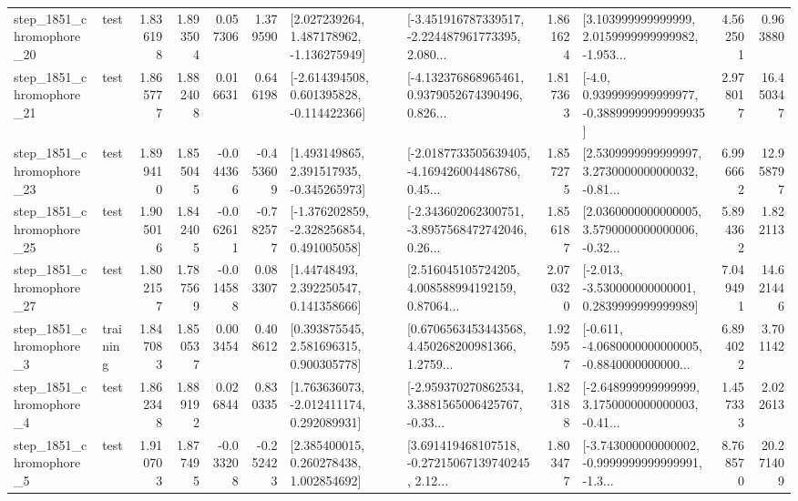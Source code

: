 \begin{tabular}{llrrrrllrlrr}
 step\_1851\_chromophore\_20 &      test &      1.836198 &    1.893504 &      0.057306 &  1.379590 &    [2.027239264, 1.487178962, -1.136275949] &  [-3.451916787339517, -2.224487961773395, 2.080... &       1.861624 &  [3.103999999999999, 2.0159999999999982, -1.953... &            4.562501 &          0.963880 \\
 step\_1851\_chromophore\_21 &      test &      1.865777 &    1.882408 &      0.016631 &  0.646198 &   [-2.614394508, 0.601395828, -0.114422366] &  [-4.132376868965461, 0.9379052674390496, 0.826... &       1.817363 &   [-4.0, 0.9399999999999977, -0.38899999999999935] &            2.978017 &         16.450347 \\
 step\_1851\_chromophore\_23 &      test &      1.899410 &    1.855045 &     -0.044366 & -0.453609 &    [1.493149865, 2.391517935, -0.345265973] &  [-2.0187733505639405, -4.169426004486786, 0.45... &       1.857275 &  [2.5309999999999997, 3.2730000000000032, -0.81... &            6.996662 &         12.958797 \\
 step\_1851\_chromophore\_25 &      test &      1.905016 &    1.842405 &     -0.062611 & -0.782577 &   [-1.376202859, -2.328256854, 0.491005058] &  [-2.343602062300751, -3.8957568472742046, 0.26... &       1.856187 &  [2.0360000000000005, 3.5790000000000006, -0.32... &            5.894362 &          1.822113 \\
 step\_1851\_chromophore\_27 &      test &      1.802157 &    1.787569 &     -0.014588 &  0.083307 &      [1.44748493, 2.392250547, 0.141358666] &  [2.516045105724205, 4.008588994192159, 0.87064... &       2.070320 &   [-2.013, -3.530000000000001, 0.2839999999999989] &            7.049491 &         14.621446 \\
  step\_1851\_chromophore\_3 &  training &      1.847083 &    1.850537 &      0.003454 &  0.408612 &     [0.393875545, 2.581696315, 0.900305778] &  [0.6706563453443568, 4.450268200981366, 1.2759... &       1.925957 &  [-0.611, -4.0680000000000005, -0.8840000000000... &            6.894022 &          3.701142 \\
  step\_1851\_chromophore\_4 &      test &      1.862348 &    1.889192 &      0.026844 &  0.830335 &    [1.763636073, -2.012411174, 0.292089931] &  [-2.959370270862534, 3.3881565006425767, -0.33... &       1.823188 &  [-2.648999999999999, 3.1750000000000003, -0.41... &            1.457333 &          2.022613 \\
  step\_1851\_chromophore\_5 &      test &      1.910703 &    1.877495 &     -0.033208 & -0.252423 &     [2.385400015, 0.260278438, 1.002854692] &  [3.691419468107518, -0.27215067139740245, 2.12... &       1.803477 &  [-3.743000000000002, -0.9999999999999991, -1.3... &            8.768570 &         20.271409 \\

\end{tabular}
